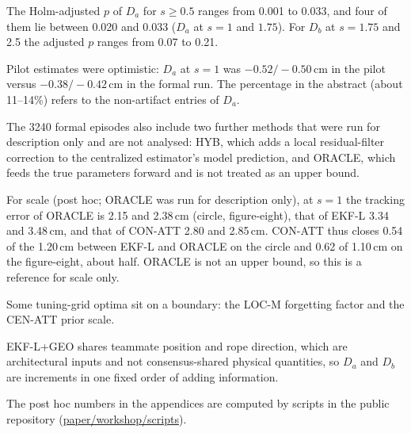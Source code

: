 \documentclass[conference]{IEEEtran}
\begin{document}
The Holm-adjusted $p$ of $D_a$ for $s\ge0.5$ ranges from 0.001 to 0.033, and four of them lie between 0.020 and 0.033 ($D_a$ at $s=1$ and $1.75$). For $D_b$ at $s=1.75$ and 2.5 the adjusted $p$ ranges from 0.07 to 0.21.

Pilot estimates were optimistic: $D_a$ at $s=1$ was $-0.52/-0.50$\,cm in the pilot versus $-0.38/-0.42$\,cm in the formal run. The percentage in the abstract (about 11--14\%) refers to the non-artifact entries of $D_a$.

The 3240 formal episodes also include two further methods that were run for description only and are not analysed: HYB, which adds a local residual-filter correction to the centralized estimator's model prediction, and ORACLE, which feeds the true parameters forward and is not treated as an upper bound.

For scale (post hoc; ORACLE was run for description only), at $s{=}1$ the tracking error of ORACLE is 2.15 and 2.38\,cm (circle, figure-eight), that of EKF-L 3.34 and 3.48\,cm, and that of CON-ATT 2.80 and 2.85\,cm. CON-ATT thus closes 0.54 of the 1.20\,cm between EKF-L and ORACLE on the circle and 0.62 of 1.10\,cm on the figure-eight, about half. ORACLE is not an upper bound, so this is a reference for scale only.

Some tuning-grid optima sit on a boundary: the LOC-M forgetting factor and the CEN-ATT prior scale.

EKF-L+GEO shares teammate position and rope direction, which are architectural inputs and not consensus-shared physical quantities, so $D_a$ and $D_b$ are increments in one fixed order of adding information.

The post hoc numbers in the appendices are computed by scripts in the public repository (\url{paper/workshop/scripts}).
\end{document}
